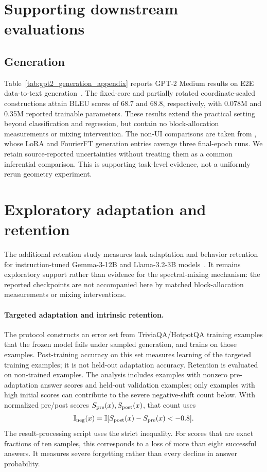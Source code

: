 \section{Supporting downstream evaluations}
\label{app:downstream}
\subsection{Generation}
\label{app:generation}

Table~\ref{tab:gpt2_generation_appendix} reports GPT-2 Medium results on E2E data-to-text generation~\citep{novikova2017e2e}. The fixed-core and partially rotated coordinate-scaled constructions attain BLEU scores of 68.7 and 68.8, respectively, with 0.078M and 0.35M reported trainable parameters. These results extend the practical setting beyond classification and regression, but contain no block-allocation measurements or mixing intervention. The non-UI comparisons are taken from \citet{gao2024parameter}, whose LoRA and FourierFT generation entries average three final-epoch runs. We retain source-reported uncertainties without treating them as a common inferential comparison. This is supporting task-level evidence, not a uniformly rerun geometry experiment.


\section{Exploratory adaptation and retention}
\label{app:retention}

The additional retention study measures task adaptation and behavior retention for instruction-tuned Gemma-3-12B and Llama-3.2-3B models~\citep{gemma3_2025,llama3_2024}. It remains exploratory support rather than evidence for the spectral-mixing mechanism: the reported checkpoints are not accompanied here by matched block-allocation measurements or mixing interventions.

\paragraph{Targeted adaptation and intrinsic retention.}
The protocol constructs an error set from TriviaQA/HotpotQA training examples that the frozen model fails under sampled generation, and trains on those examples. Post-training accuracy on this set measures learning of the targeted training examples; it is not held-out adaptation accuracy. Retention is evaluated on non-trained examples. The analysis includes examples with nonzero pre-adaptation answer scores and held-out validation examples; only examples with high initial scores can contribute to the severe negative-shift count below. With normalized pre/post scores $S_{\mathrm{pre}}(x),S_{\mathrm{post}}(x)$, that count uses
\begin{equation}
\mathbb I_{\mathrm{neg}}(x)=\mathbb I[S_{\mathrm{post}}(x)-S_{\mathrm{pre}}(x)<-0.8].
\end{equation}
The result-processing script uses the strict inequality. For scores that are exact fractions of ten samples, this corresponds to a loss of more than eight successful answers. It measures severe forgetting rather than every decline in answer probability.

